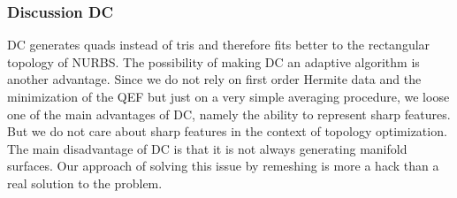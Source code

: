 \subsubsection{Discussion \ac{DC}}
\ac{DC} generates \acp{quad} instead of \acp{tri} and therefore fits better to the rectangular topology of \ac{NURBS}. The possibility of making \ac{DC} an adaptive algorithm is another advantage.
Since we do not rely on first order Hermite data and the minimization of the \ac{QEF} but just on a very simple averaging procedure, we loose one of the main advantages of \ac{DC}, namely the ability to represent sharp features. But we do not care about sharp features in the context of topology optimization. 
The main disadvantage of \ac{DC} is that it is not always generating manifold surfaces. Our approach of solving this issue by remeshing is more a hack than a real solution to the problem.